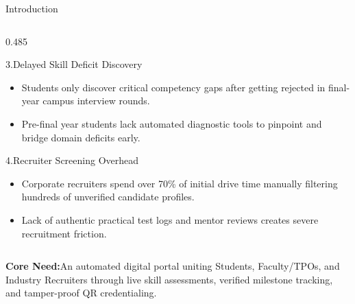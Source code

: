 \documentclass[aspectratio=169,10pt,xcolor={table,dvipsnames}]{beamer}
\begin{document}
\begin{frame}[t]{Introduction}
\begin{columns}[T]
    \begin{column}{0.485\textwidth}
      \begin{navytitlecard}{3.\;Delayed Skill Deficit Discovery}
        \fontsize{6.5}{7.8}\selectfont
        \begin{itemize}\setlength{\itemsep}{0.8pt}
          \item Students only discover critical competency gaps after getting rejected in final-year campus interview rounds.
          \item Pre-final year students lack automated diagnostic tools to pinpoint and bridge domain deficits early.
        \end{itemize}
      \end{navytitlecard}
      \vspace{0.04cm}
      \begin{plaincard}{4.\;Recruiter Screening Overhead}
        \fontsize{6.5}{7.8}\selectfont
        \begin{itemize}\setlength{\itemsep}{0.8pt}
          \item Corporate recruiters spend over 70\% of initial drive time manually filtering hundreds of unverified candidate profiles.
          \item Lack of authentic practical test logs and mentor reviews creates severe recruitment friction.
        \end{itemize}
      \end{plaincard}
    \end{column}
  \end{columns}

  \vspace{0.04cm}
  \begin{tcolorbox}[
    enhanced,colback=LightSilver,colframe=BorderColor,
    arc=2pt,boxrule=0.6pt,
    left=5pt,right=5pt,top=2pt,bottom=2pt]
    \centering\fontsize{6.3}{7.5}\selectfont
    \textbf{\color{Navy}Core Need:}\;An automated digital portal uniting Students, Faculty/TPOs, and Industry Recruiters through live skill assessments, verified milestone tracking, and tamper-proof QR credentialing.
  \end{tcolorbox}
\end{frame}
\end{document}
